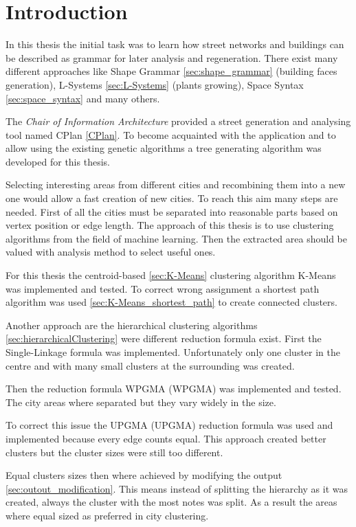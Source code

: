 \chapter{Introduction}
In this thesis the initial task was to learn how street networks and buildings can be described as grammar for later analysis and regeneration. There exist many different approaches like Shape Grammar \ref{sec:shape_grammar} (building faces generation), L-Systems \ref{sec:L-Systems} (plants growing), Space Syntax \ref{sec:space_syntax} and many others. 

The \textit{Chair of Information Architecture} provided a street generation and analysing tool named CPlan \ref{CPlan}. To become acquainted with the application and to allow using the existing genetic algorithms a tree generating algorithm was developed for this thesis. 

Selecting interesting areas from different cities and recombining them into a new one would allow a fast creation of new cities. To reach this aim many steps are needed. First of all the cities must be separated into reasonable parts based on vertex position or edge length. The approach of this thesis is to use clustering algorithms from the field of machine learning. Then the extracted area should be valued with analysis method to select useful ones.

For this thesis the centroid-based \ref{sec:K-Means} clustering algorithm K-Means was implemented and tested. To correct wrong assignment a shortest path algorithm was used \ref{sec:K-Means_shortest_path} to create connected clusters.

Another approach are the hierarchical clustering algorithms \ref{sec:hierarchicalClustering} were different reduction formula exist. First the Single-Linkage formula was implemented. Unfortunately only one cluster in the centre and with many small clusters at the surrounding was created.

Then the reduction formula \acrshort{WPGMA} (\acrlong{WPGMA}) was implemented and tested. The city areas where separated but they vary widely in the size.

To correct this issue the \acrshort{UPGMA} (\acrlong{UPGMA}) reduction formula was used and implemented because every edge counts equal. This approach created better clusters but the cluster sizes were still too different.

Equal clusters sizes then where achieved by modifying the output \ref{sec:outout_modification}. This means instead of splitting the hierarchy as it was created, always the cluster with the most notes was split. As a result the areas where equal sized as preferred in city clustering.

